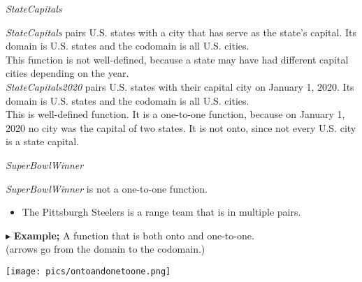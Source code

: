 \documentclass{ximera}
\begin{document}
\begin{example} \textit{StateCapitals}


\textit{StateCapitals} pairs U.S. states with a city that has serve as the state's capital. Its domain is U.S. states and the codomain is all U.S. cities.\\



This function is not well-defined, because a state may have had different capital cities depending on the year. \\


\textit{StateCapitals2020} pairs U.S. states with their capital city on January 1, 2020. Its domain is U.S. states and the codomain is all U.S. cities.\\


This is well-defined function.  It is a one-to-one function, because on January 1, 2020 no city was the capital of two states.  It is not onto, since not every U.S. city is a state capital.


\end{example}











\begin{example} \textit{SuperBowlWinner}


\textit{SuperBowlWinner} is not a one-to-one function.


\begin{itemize}
\item The Pittsburgh Steelers is a range team that is in multiple pairs. 
\end{itemize}

\end{example}









$\blacktriangleright$ \textbf{Example;} A function that is both onto and one-to-one.  \\
(arrows go from the domain to the codomain.)

\begin{image}
\texttt{[image: pics/ontoandonetoone.png]}
\end{image}
\end{document}

